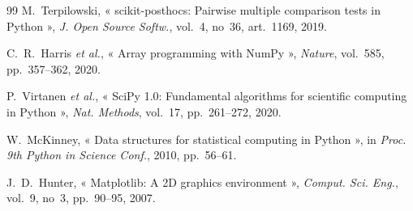 \begin{thebibliography}{99}
 M.~Terpilowski, « scikit-posthocs: Pairwise multiple comparison tests in Python », \emph{J. Open Source Softw.}, vol.~4, no~36, art.~1169, 2019.

 C.~R.~Harris \emph{et al.}, « Array programming with NumPy », \emph{Nature}, vol.~585, pp.~357--362, 2020.

 P.~Virtanen \emph{et al.}, « SciPy 1.0: Fundamental algorithms for scientific computing in Python », \emph{Nat. Methods}, vol.~17, pp.~261--272, 2020.

 W.~McKinney, « Data structures for statistical computing in Python », in \emph{Proc. 9th Python in Science Conf.}, 2010, pp.~56--61.

 J.~D.~Hunter, « Matplotlib: A 2D graphics environment », \emph{Comput. Sci. Eng.}, vol.~9, no~3, pp.~90--95, 2007.

\end{thebibliography}

